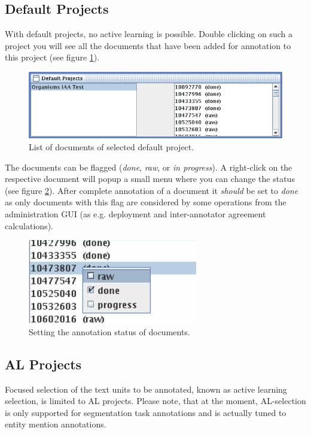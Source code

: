 \documentclass[DIV12,english,11pt,halfparskip]{scrartcl}
\begin{document}
\subsection{Default Projects}
With default projects, no active learning is possible. Double clicking
on such a project you will see all the documents that have been added
for annotation to this project (see figure \ref{fig:bdlist}).

\begin{figure}[h]
  \centering
  \includegraphics[scale=0.66]{figs/BaseDataList2.jpg}
  \caption{List of documents of selected default project.}
  \label{fig:bdlist}
\end{figure}


The documents can be flagged (\textit{done}, \textit{raw}, or
\textit{in progress}). A right-click on the respective document will
popup a small menu where you can change the status (see figure
\ref{fig:bdstatus}). After complete annotation of a document it
\emph{should} be set to \emph{done} as only documents with this flag
are considered by some operations from the administration GUI (as
e.g. deployment and inter-annotator agreement calculations).

\begin{figure}[h]
  \centering
  \includegraphics[scale=0.9]{figs/BaseDataStatus.jpg}
  \caption{Setting the annotation status of documents.}
  \label{fig:bdstatus}
\end{figure}


\subsection{AL Projects}

Focused selection of the text units to be annotated, known as active
learning selection, is limited to AL projects. Please note, that at the
moment, AL-selection is only supported for segmentation task
annotations and is actually tuned to entity mention annotations.
\end{document}
